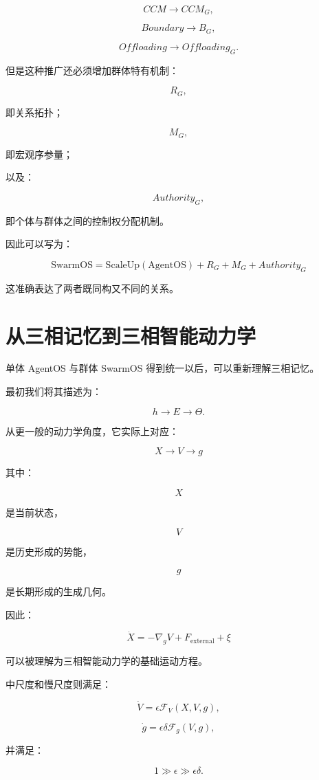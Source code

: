 \[
CCM
\rightarrow
CCM_G,
\]

\[
Boundary
\rightarrow
B_G,
\]

\[
Offloading
\rightarrow
Offloading_G.
\]

但是这种推广还必须增加群体特有机制：

\[
R_G,
\]

即关系拓扑；

\[
M_G,
\]

即宏观序参量；

以及：

\[
Authority_G,
\]

即个体与群体之间的控制权分配机制。

因此可以写为：

\[
\boxed{
\mathrm{SwarmOS}
=
\mathrm{ScaleUp}(\mathrm{AgentOS})
+
R_G
+
M_G
+
Authority_G
}
\]

这准确表达了两者既同构又不同的关系。


\section{从三相记忆到三相智能动力学}

单体 AgentOS 与群体 SwarmOS 得到统一以后，可以重新理解三相记忆。

最初我们将其描述为：

\[
h
\rightarrow
E
\rightarrow
\Theta.
\]

从更一般的动力学角度，它实际上对应：

\[
\boxed{
X
\rightarrow
V
\rightarrow
g
}
\]

其中：

\[
X
\]

是当前状态，

\[
V
\]

是历史形成的势能，

\[
g
\]

是长期形成的生成几何。

因此：

\[
\boxed{
\dot X
=
-\nabla_gV
+
F_{\mathrm{external}}
+
\xi
}
\]

可以被理解为三相智能动力学的基础运动方程。

中尺度和慢尺度则满足：

\[
\dot V
=
\epsilon
\mathcal{F}_V(X,V,g),
\]

\[
\dot g
=
\epsilon\delta
\mathcal{F}_g(V,g),
\]

并满足：

\[
1
\gg
\epsilon
\gg
\epsilon\delta.
\]

